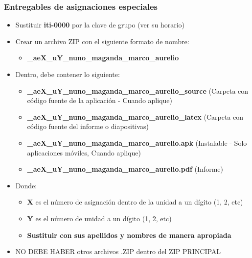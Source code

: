 \begin{frame}
\frametitle{Entregables de asignaciones especiales}
    \begin{itemize}
    \item Sustituir \textbf{iti-0000} por la clave de grupo (ver su horario) 
    \item Crear un archivo ZIP con el siguiente formato de nombre:
    \begin{itemize}
        \item \textbf{\clavegrupo\_aeX\_uY\_nuno\_maganda\_marco\_aurelio}
    \end{itemize}
    \item Dentro, debe contener lo siguiente:
        \begin{itemize}
        \item \textbf{\clavegrupo\_aeX\_uY\_nuno\_maganda\_marco\_aurelio\_source} (Carpeta con c\'odigo fuente de la aplicaci\'on - Cuando aplique)
        \item \textbf{\clavegrupo\_aeX\_uY\_nuno\_maganda\_marco\_aurelio\_latex} (Carpeta con c\'odigo fuente del informe o diapositivas)
        \item \textbf{\clavegrupo\_aeX\_uY\_nuno\_maganda\_marco\_aurelio.apk} (Instalable - Solo aplicaciones móviles, Cuando aplique)
        \item \textbf{\clavegrupo\_aeX\_uY\_nuno\_maganda\_marco\_aurelio.pdf} (Informe)
        \end{itemize}
    \item Donde:
        \begin{itemize}
        \item \scriptsize{\textbf{X} es el n\'umero de asignación dentro de la unidad a un d\'igito (1, 2, etc)}
        \item \scriptsize{\textbf{Y} es el n\'umero de unidad a un d\'igito (1, 2, etc)}
        \item \scriptsize{\textbf{Sustituir con sus apellidos y nombres de manera apropiada} }
        \end{itemize}
	\item \scriptsize{NO DEBE HABER otros archivos .ZIP dentro del ZIP PRINCIPAL}
    \end{itemize}
\end{frame}





